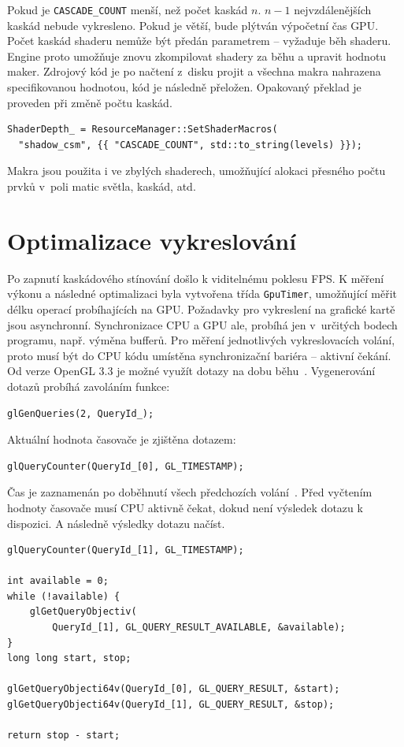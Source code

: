 \documentclass[thesis=M,czech]{FITthesis}[2019/12/23]
\begin{document}
Pokud je \texttt{CASCADE\_COUNT} menší, než počet kaskád $n$. $n - 1$ nejvzdálenějších kaskád nebude vykresleno. Pokud je větší, bude plýtván výpočetní čas GPU. Počet kaskád shaderu nemůže být předán parametrem -- vyžaduje běh shaderu. Engine proto umožňuje znovu zkompilovat shadery za běhu a upravit hodnotu maker. Zdrojový kód je po načtení z~disku projit a všechna makra nahrazena specifikovanou hodnotou, kód je následně přeložen. Opakovaný překlad je proveden při změně počtu kaskád.

\begin{verbatim}
ShaderDepth_ = ResourceManager::SetShaderMacros(
  "shadow_csm", {{ "CASCADE_COUNT", std::to_string(levels) }});
\end{verbatim}

Makra jsou použita i ve zbylých shaderech, umožňující alokaci přesného počtu prvků v~poli matic světla, kaskád, atd.

\section{Optimalizace vykreslování}

Po zapnutí kaskádového stínování došlo k viditelnému poklesu FPS. K měření výkonu a následné optimalizaci byla vytvořena třída \texttt{GpuTimer}, umožňující měřit délku operací probíhajících na GPU. Požadavky pro vykreslení na grafické kartě jsou asynchronní. Synchronizace CPU a GPU ale, probíhá jen v~určitých bodech programu, např. výměna bufferů. Pro měření jednotlivých vykreslovacích volání, proto musí být do CPU kódu umístěna synchronizační bariéra -- aktivní čekání. Od verze OpenGL 3.3 je možné využít dotazy na dobu běhu~\cite{timer}. Vygenerování dotazů probíhá zavoláním funkce: 

\begin{verbatim}
glGenQueries(2, QueryId_);
\end{verbatim}

Aktuální hodnota časovače je zjištěna dotazem:

\begin{verbatim}
glQueryCounter(QueryId_[0], GL_TIMESTAMP);
\end{verbatim}

Čas je zaznamenán po doběhnutí všech předchozích volání~\cite{kronos_counter}. Před vyčtením hodnoty časovače musí CPU aktivně čekat, dokud není výsledek dotazu k dispozici. A následně výsledky dotazu načíst.

\begin{verbatim}
glQueryCounter(QueryId_[1], GL_TIMESTAMP);

int available = 0;
while (!available) {
    glGetQueryObjectiv(
        QueryId_[1], GL_QUERY_RESULT_AVAILABLE, &available);
}
long long start, stop;

glGetQueryObjecti64v(QueryId_[0], GL_QUERY_RESULT, &start);
glGetQueryObjecti64v(QueryId_[1], GL_QUERY_RESULT, &stop);

return stop - start;
\end{verbatim}
\end{document}
